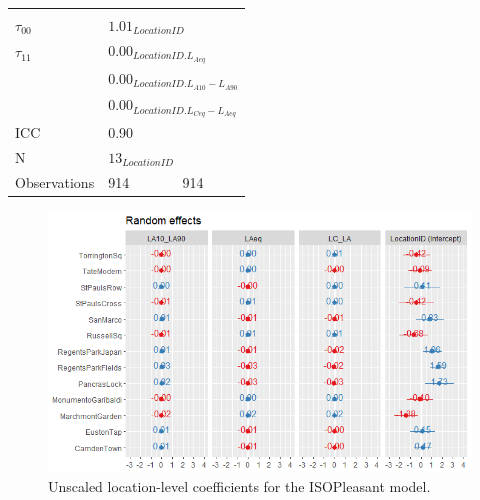 \begin{table}[!ht]
\begin{tabular}{@{}l|lccccc@{}}
  \multicolumn{1}{l}{} \\
$\tau_{00}$ &
  \multicolumn{6}{l}{$1.01_{LocationID}$} \\
$\tau_{11}$ &
  \multicolumn{6}{l}{$0.00_{LocationID.L_{Aeq}}$} \\
 &
  \multicolumn{6}{l}{$0.00_{LocationID.L_{A10}-L_{A90}}$} \\
 &
  \multicolumn{6}{l}{$0.00_{LocationID.L_{Ceq}-L_{Aeq}}$} \\
ICC &
  0.90 &
  \multicolumn{1}{l}{} &
  \multicolumn{1}{l}{} &
  \multicolumn{1}{l}{} &
  \multicolumn{1}{l}{} &
  \multicolumn{1}{l}{} \\ \midrule
N &
  \multicolumn{6}{l}{$13_{LocationID}$} \\
Observations            & 914 & \multicolumn{1}{l}{} & \multicolumn{1}{l}{} & \multicolumn{1}{l}{914} & \multicolumn{1}{l}{} & \multicolumn{1}{l}{} \\ \bottomrule
\end{tabular}
\end{table}

\begin{figure}[!ht]
    \centering
    \includegraphics[width=\textwidth]{Figures/Lockdown Figure7.jpg}
    \caption{Unscaled location-level coefficients for the ISOPleasant model.}
    \label{fig:unsclRandom}
\end{figure}

